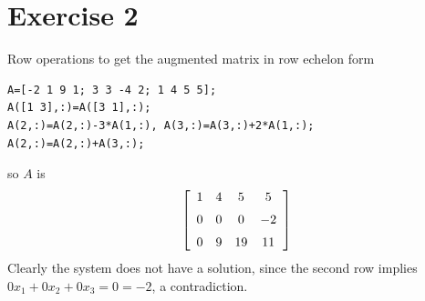 \documentclass{article}
\begin{document}

\section*{Exercise 2}

Row operations to get the augmented matrix in row echelon form
\begin{verbatim}
A=[-2 1 9 1; 3 3 -4 2; 1 4 5 5];
A([1 3],:)=A([3 1],:);
A(2,:)=A(2,:)-3*A(1,:), A(3,:)=A(3,:)+2*A(1,:);
A(2,:)=A(2,:)+A(3,:);
\end{verbatim}
so $A$ is
\begin{align*}
\left[ \begin {array}{cccc} 1&4&5&5\\\noalign{\medskip}0&0&0&-2\\\noalign{\medskip}0&9&19&11\end {array} \right] 
\end{align*}
Clearly the system does not have a solution, since the second row implies $0x_1 + 0x_2 + 0x_3 = 0 = -2$, a contradiction.
\end{document}
